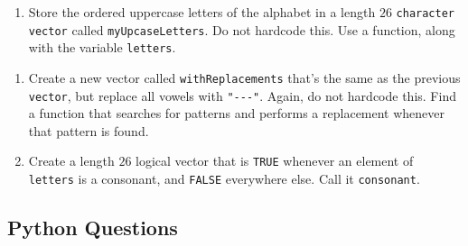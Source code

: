 \documentclass[12pt,krantz2]{krantz}
\providecommand{\tightlist}{%
  \setlength{\itemsep}{0pt}\setlength{\parskip}{0pt}}
\begin{document}
\begin{enumerate}
\def\labelenumi{\arabic{enumi}.}
\setcounter{enumi}{6}
\tightlist
\item
  Store the ordered uppercase letters of the alphabet in a length \(26\) \texttt{character} \texttt{vector} called \texttt{myUpcaseLetters}. Do not hardcode this. Use a function, along with the variable \texttt{letters}.
\end{enumerate}

\begin{enumerate}
\def\labelenumi{\alph{enumi}.}
\item
  Create a new vector called \texttt{withReplacements} that's the same as the previous \texttt{vector}, but replace all vowels with \texttt{"-\/-\/-"}. Again, do not hardcode this. Find a function that searches for patterns and performs a replacement whenever that pattern is found.
\item
  Create a length \(26\) logical vector that is \texttt{TRUE} whenever an element of \texttt{letters} is a consonant, and \texttt{FALSE} everywhere else. Call it \texttt{consonant}.
\end{enumerate}

\hypertarget{python-questions-1}{%
\subsection{Python Questions}\label{python-questions-1}}
\end{document}
